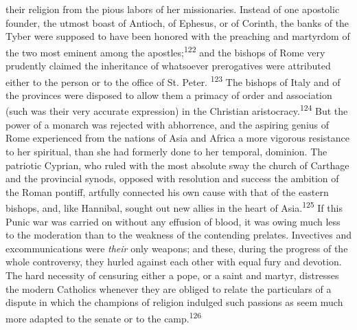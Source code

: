 their religion from the pious labors of her missionaries. Instead
of one apostolic founder, the utmost boast of Antioch, of
Ephesus, or of Corinth, the banks of the Tyber were supposed to
have been honored with the preaching and martyrdom of the two
most eminent among the apostles;\textsuperscript{122} and the bishops of Rome very
prudently claimed the inheritance of whatsoever prerogatives were
attributed either to the person or to the office of St. Peter. \textsuperscript{123}
The bishops of Italy and of the provinces were disposed to
allow them a primacy of order and association (such was their
very accurate expression) in the Christian aristocracy.\textsuperscript{124} But
the power of a monarch was rejected with abhorrence, and the
aspiring genius of Rome experienced from the nations of Asia and
Africa a more vigorous resistance to her spiritual, than she had
formerly done to her temporal, dominion. The patriotic Cyprian,
who ruled with the most absolute sway the church of Carthage and
the provincial synods, opposed with resolution and success the
ambition of the Roman pontiff, artfully connected his own cause
with that of the eastern bishops, and, like Hannibal, sought out
new allies in the heart of Asia.\textsuperscript{125} If this Punic war was
carried on without any effusion of blood, it was owing much less
to the moderation than to the weakness of the contending
prelates. Invectives and excommunications were \textit{their} only
weapons; and these, during the progress of the whole controversy,
they hurled against each other with equal fury and devotion. The
hard necessity of censuring either a pope, or a saint and martyr,
distresses the modern Catholics whenever they are obliged to
relate the particulars of a dispute in which the champions of
religion indulged such passions as seem much more adapted to the
senate or to the camp.\textsuperscript{126}




